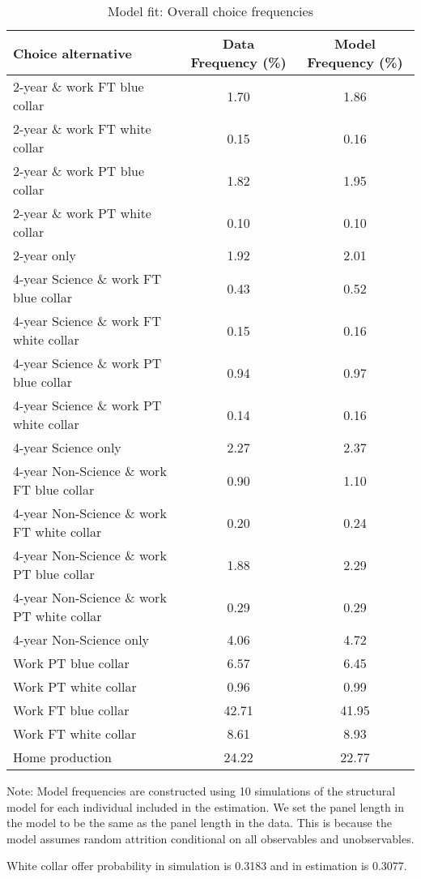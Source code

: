 \begin{table}[ht]
\caption{Model fit: Overall choice frequencies}
\label{tab:modelfit}
\centering{}
\begin{threeparttable}
\begin{tabular}{lcc}
\toprule
Choice alternative     & Data Frequency (\%) & Model Frequency (\%)\\
\midrule
2-year \& work FT blue collar&1.70&1.86 \\
2-year \& work FT white collar&0.15&0.16 \\
2-year \& work PT blue collar&1.82&1.95 \\
2-year \& work PT white collar&0.10&0.10 \\
2-year only&1.92&2.01 \\
4-year Science \& work FT blue collar&0.43&0.52 \\
4-year Science \& work FT white collar&0.15&0.16 \\
4-year Science \& work PT blue collar&0.94&0.97 \\
4-year Science \& work PT white collar&0.14&0.16 \\
4-year Science only&2.27&2.37 \\
4-year Non-Science \& work FT blue collar&0.90&1.10 \\
4-year Non-Science \& work FT white collar&0.20&0.24 \\
4-year Non-Science \& work PT blue collar&1.88&2.29 \\
4-year Non-Science \& work PT white collar&0.29&0.29 \\
4-year Non-Science only&4.06&4.72 \\
Work PT blue collar&6.57&6.45 \\
Work PT white collar&0.96&0.99 \\
Work FT blue collar&42.71&41.95 \\
Work FT white collar&8.61&8.93 \\
Home production&24.22&22.77 \\
\bottomrule
\end{tabular}
\footnotesize Note: Model frequencies are constructed using 10 simulations of the structural model for each individual included in the estimation.  We set the panel length in the model to be the same as the panel length in the data. This is because the model assumes random attrition conditional on all observables and unobservables.

White collar offer probability in simulation is 0.3183 and in estimation is 0.3077.
\end{threeparttable}
\end{table}
